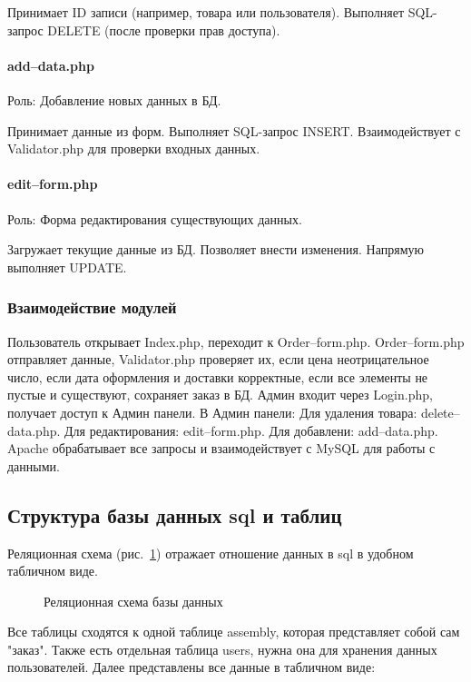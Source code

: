 Принимает ID записи (например, товара или пользователя).
Выполняет SQL-запрос DELETE (после проверки прав доступа).
\paragraph{add--data.php}
Роль: Добавление новых данных в БД.

Принимает данные из форм.
Выполняет SQL-запрос INSERT.
Взаимодействует с Validator.php для проверки входных данных.
\paragraph{edit--form.php}
Роль: Форма редактирования существующих данных.

Загружает текущие данные из БД.
Позволяет внести изменения.
Напрямую выполняет UPDATE.
\subsubsection{Взаимодействие модулей}
Пользователь открывает Index.php, переходит к Order--form.php.
Order--form.php отправляет данные, Validator.php проверяет их, если цена неотрицательное число, если дата оформления и доставки корректные, если все элементы не пустые и существуют, сохраняет заказ в БД.
Админ входит через Login.php, получает доступ к Админ панели.
В Админ панели:
Для удаления товара: delete--data.php.
Для редактирования: edit--form.php.
Для добавлени: add--data.php.
Apache обрабатывает все запросы и взаимодействует с MySQL для работы с данными.


\newpage
\subsection{Структура базы данных sql и таблиц}

Реляционная схема (рис.~\ref{struct:image}) отражает отношение данных в sql в удобном табличном виде.

\vspace{-8mm} 
\begin{figure}[ht]
\caption{Реляционная схема базы данных}
\label{struct:image}
\end{figure}

Все таблицы сходятся к одной таблице assembly, которая представляет собой сам "заказ". Также есть отдельная таблица users, нужна она для хранения данных пользователей.
Далее представлены все данные в табличном виде:

